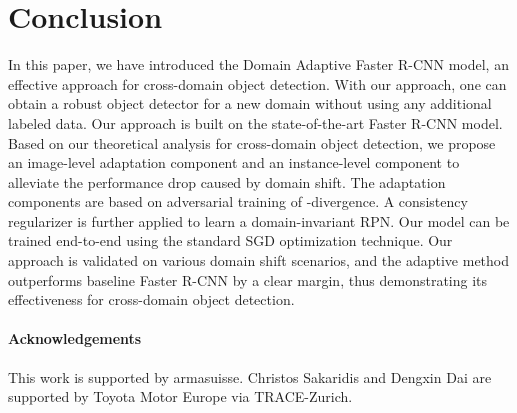 \documentclass[10pt,twocolumn,letterpaper]{article}
\begin{document}
\section{Conclusion}
\label{sec:conclude}
In this paper, we have introduced the Domain Adaptive Faster R-CNN model, an effective approach for cross-domain object detection. With our approach, one can obtain a robust object detector for a new domain without using any additional labeled data. Our approach is built on the state-of-the-art Faster R-CNN model. Based on our theoretical analysis for cross-domain object detection, we propose an image-level adaptation component and an instance-level component to alleviate the performance drop caused by domain shift. The adaptation components are based on adversarial training of -divergence. A consistency regularizer is further applied to learn a domain-invariant RPN. Our model can be trained end-to-end using the standard SGD optimization technique.  Our approach is validated on various domain shift scenarios, and the adaptive method outperforms baseline Faster R-CNN by a clear margin, thus demonstrating its effectiveness for cross-domain object detection. 

\vspace{-2mm}

\paragraph{Acknowledgements} 
This work is supported by armasuisse. Christos Sakaridis and Dengxin Dai are supported by Toyota Motor Europe via TRACE-Zurich.

{\small


}
\end{document}
